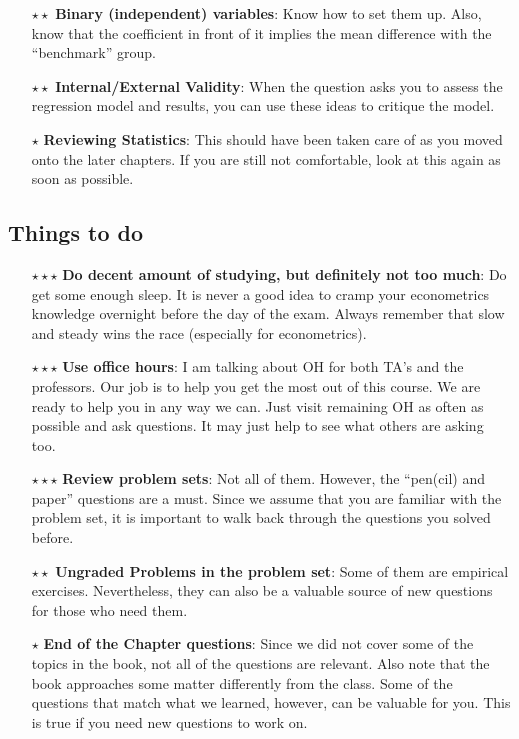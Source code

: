 \documentclass[12pt]{article}
\theoremstyle{definition}
\theoremstyle{property}
\theoremstyle{assumption}
\theoremstyle{example}
\theoremstyle{comment}
\begin{document}
\begin{itemize}
\item[$\star\star$]\textbf{Binary (independent) variables}: Know how to set them up. Also, know that the coefficient in front of it implies the mean difference with the ``benchmark'' group.
\item[$\star\star$]\textbf{Internal/External Validity}: When the question asks you to assess the regression model and results, you can use these ideas to critique the model. 
\item[$\star$]\textbf{Reviewing Statistics}: This should have been taken care of as you moved onto the later chapters. If you are still not comfortable, look at this again as soon as possible. 
\end{itemize}
\subsection{Things to do}
\begin{itemize}
\item[$\star\star\star$] \textbf{Do decent amount of studying, but definitely not too much}: Do get some enough sleep. It is never a good idea to cramp your econometrics knowledge overnight before the day of the exam. Always remember that slow and steady wins the race (especially for econometrics). 
\item[$\star\star\star$] \textbf{Use office hours}: I am talking about OH for both TA's and the professors. Our job is to help you get the most out of this course. We  are ready to help you in any way we can. Just visit remaining OH as often as possible and ask questions. It may just help to see what others are asking too.
\item[$\star\star\star$]\textbf{Review problem sets}: Not all of them. However, the ``pen(cil) and paper'' questions are a must. Since we assume that you are familiar with the problem set, it is important to walk back through the questions you solved before. 
\item[$\star\star$] \textbf{Ungraded Problems in the problem set}: Some of them are empirical exercises. Nevertheless, they can also be a valuable source of new questions for those who need them. 
\item[$\star$]\textbf{End of the Chapter questions}: Since we did not cover some of the topics in the book, not all of the questions are relevant. Also note that the book approaches some matter differently from the class. Some of the questions that match what we learned, however, can be valuable for you. This is true if you need new questions to work on. 
\end{itemize}

\end{document}
